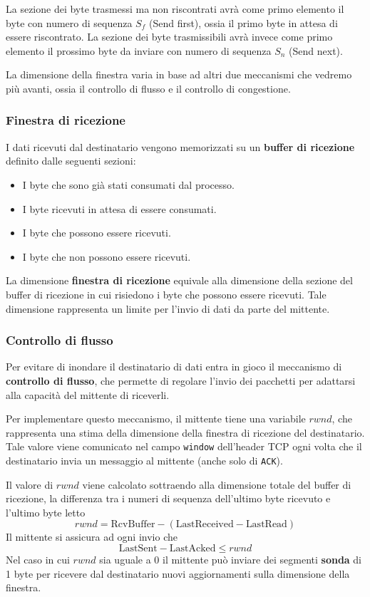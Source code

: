 La sezione dei byte trasmessi ma non riscontrati avrà come primo 
elemento il byte con numero di sequenza $S_f$ (Send first), ossia il 
primo byte in attesa di essere riscontrato. La sezione dei byte 
trasmissibili avrà invece come primo elemento il prossimo byte da 
inviare con numero di sequenza $S_n$ (Send next).

La dimensione della finestra varia in base ad altri due meccanismi che 
vedremo più avanti, ossia il controllo di flusso e il controllo di 
congestione.

\subsubsection{Finestra di ricezione}
I dati ricevuti dal destinatario vengono memorizzati su un 
\textbf{buffer di ricezione} definito dalle seguenti sezioni:
\begin{itemize}
	\item I byte che sono già stati consumati dal processo.
	\item I byte ricevuti in attesa di essere consumati.
	\item I byte che possono essere ricevuti.
	\item I byte che non possono essere ricevuti.
\end{itemize}
La dimensione \textbf{finestra di ricezione} equivale alla dimensione 
della sezione del buffer di ricezione in cui risiedono i byte che 
possono essere ricevuti. Tale dimensione rappresenta un limite per 
l'invio di dati da parte del mittente.

\subsubsection{Controllo di flusso}
Per evitare di inondare il destinatario di dati entra in gioco il 
meccanismo di \textbf{controllo di flusso}, che permette di regolare 
l'invio dei pacchetti per adattarsi alla capacità del mittente di 
riceverli.

Per implementare questo meccanismo, il mittente tiene una variabile 
$rwnd$, che rappresenta una stima della dimensione della finestra di
ricezione del destinatario. Tale valore viene comunicato nel campo 
\verb|window| dell'header TCP ogni volta che il destinatario invia un
messaggio al mittente (anche solo di \verb|ACK|).

Il valore di $rwnd$ viene calcolato sottraendo alla dimensione totale 
del buffer di ricezione, la differenza tra i numeri di sequenza 
dell'ultimo byte ricevuto e l'ultimo byte letto
\[
	rwnd = \text{RcvBuffer} - (\text{LastReceived} - \text{LastRead})
\]
Il mittente si assicura ad ogni invio che
\[ \text{LastSent} - \text{LastAcked} \leq rwnd \]
Nel caso in cui $rwnd$ sia uguale a 0 il mittente può inviare dei 
segmenti \textbf{sonda} di 1 byte per ricevere dal destinatario nuovi 
aggiornamenti sulla dimensione della finestra.

